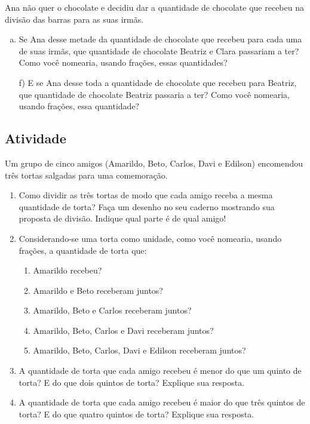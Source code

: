Ana não quer o chocolate e decidiu dar a quantidade de chocolate que recebeu na divisão das barras para as suas irmãs.

\begin{enumerate}[e)]
\item Se Ana desse metade da quantidade de chocolate que recebeu para cada uma de suas irmãs, que quantidade de chocolate Beatriz e Clara passariam a ter? Como você nomearia, usando frações, essas quantidades?
\item[f)] E se Ana desse toda a quantidade de chocolate que recebeu para Beatriz, que quantidade de chocolate  Beatriz passaria a ter? Como você nomearia, usando frações, essa quantidade?
\end{enumerate} %


\subsection{Atividade}

Um grupo de cinco amigos (Amarildo, Beto, Carlos, Davi e Edilson) encomendou três tortas salgadas para uma comemoração.

\begin{center}

\end{center}

\begin{enumerate} [\quad a)] %
  \item     Como dividir as três tortas de modo que cada amigo receba a mesma quantidade de torta? Faça um desenho no seu caderno mostrando sua proposta de divisão. Indique qual parte é de qual amigo!
  \item     Considerando-se uma torta como unidade, como você nomearia, usando frações, a quantidade de torta que:
\begin{enumerate} [\quad I)] %
      \item         Amarildo recebeu?
      \item         Amarildo e Beto receberam juntos?
      \item         Amarildo, Beto e Carlos receberam juntos?
      \item         Amarildo, Beto, Carlos e Davi receberam juntos?
      \item         Amarildo, Beto, Carlos, Davi e Edilson receberam juntos?
\end{enumerate} %

  \item     A quantidade de torta que cada amigo recebeu é menor do que um quinto de torta? E do que dois quintos de torta? Explique sua resposta.
  \item     A quantidade de torta que cada amigo recebeu é maior do que três quintos de torta? E do que quatro quintos de torta? Explique sua resposta.
\end{enumerate} %


